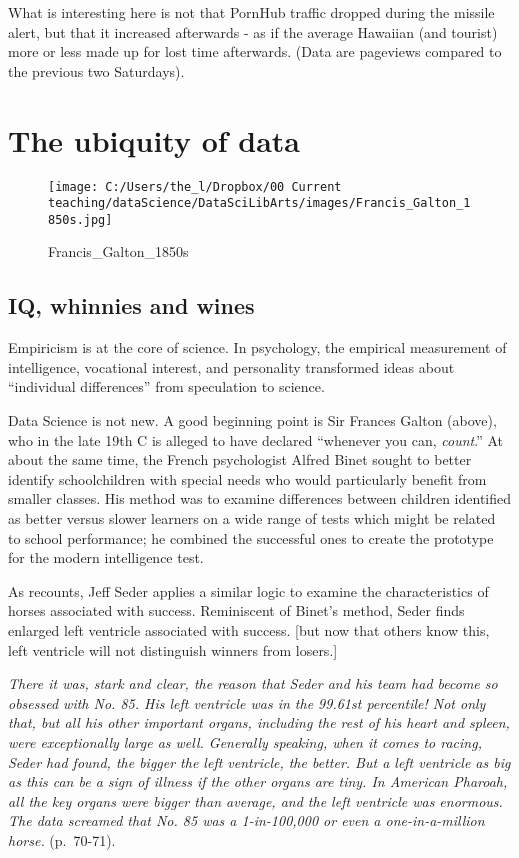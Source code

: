 \documentclass[]{book}
\theoremstyle{definition}
\theoremstyle{definition}
\theoremstyle{definition}
\theoremstyle{remark}
\begin{document}
What is interesting here is not that PornHub traffic dropped during the
missile alert, but that it increased afterwards - as if the average
Hawaiian (and tourist) more or less made up for lost time afterwards.
(Data are pageviews compared to the previous two Saturdays).

\chapter{The ubiquity of data}\label{the-ubiquity-of-data}

\begin{figure}
\centering
\texttt{[image: C:/Users/the\_l/Dropbox/00 Current teaching/dataScience/DataSciLibArts/images/Francis\_Galton\_1850s.jpg]}
\caption{Francis\_Galton\_1850s}
\end{figure}

\section{IQ, whinnies and wines}\label{iq-whinnies-and-wines}

Empiricism is at the core of science. In psychology, the empirical
measurement of intelligence, vocational interest, and personality
transformed ideas about ``individual differences'' from speculation to
science.

Data Science is not new. A good beginning point is Sir Frances Galton
(above), who in the late 19th C is alleged to have declared ``whenever
you can, \emph{count}.'' At about the same time, the French psychologist
Alfred Binet sought to better identify schoolchildren with special needs
who would particularly benefit from smaller classes. His method was to
examine differences between children identified as better versus slower
learners on a wide range of tests which might be related to school
performance; he combined the successful ones to create the prototype for
the modern intelligence test.

As \citet{stephens2017everybody} recounts, Jeff Seder applies a similar
logic to examine the characteristics of horses associated with success.
Reminiscent of Binet's method, Seder finds enlarged left ventricle
associated with success. {[}but now that others know this, left
ventricle will not distinguish winners from losers.{]}

\emph{There it was, stark and clear, the reason that Seder and his team
had become so obsessed with No. 85. His left ventricle was in the
99.61st percentile! Not only that, but all his other important organs,
including the rest of his heart and spleen, were exceptionally large as
well. Generally speaking, when it comes to racing, Seder had found, the
bigger the left ventricle, the better. But a left ventricle as big as
this can be a sign of illness if the other organs are tiny. In American
Pharoah, all the key organs were bigger than average, and the left
ventricle was enormous. The data screamed that No. 85 was a 1-in-100,000
or even a one-in-a-million horse.} (p.~70-71).
\end{document}
